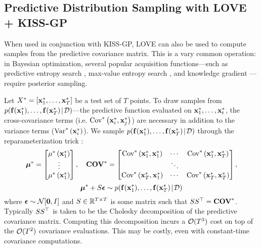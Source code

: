 \subsection{Predictive Distribution Sampling with LOVE{} + KISS-GP}
\label{sec:sampling_method}

When used in conjunction with KISS-GP, LOVE{} can also be used to compute samples from the predictive covariance matrix.
This is a vary common operation: in Bayesian optimization, several popular acquisition functions---such as predictive entropy search \cite{hernandez2014predictive}, max-value entropy search \cite{wang2017max}, and knowledge gradient \cite{frazier2009knowledge}---require posterior sampling.

Let $X^* = [ \mathbf{x}^*_1, \ldots, \mathbf{x}^*_T ]$ be a test set of $T$ points.
To draw samples from $p( \mathbf{f}(\mathbf{x}^*_1), \ldots, \mathbf{f}(\mathbf{x}^*_T) \! \mid \! \mathcal D)$---the predictive function evaluated on $\mathbf{x}^*_1, \ldots, \mathbf{x}^*_t$,
the cross-covariance terms (i.e. $\text{Cov}^* \left( \mathbf{x}^*_i, \mathbf{x}^*_j \right)$) are necessary in addition to the variance terms ($\text{Var}^* \left( \mathbf{x}^*_i \right)$).
We sample $p( \mathbf{f}(\mathbf{x}^*_1), \ldots, \mathbf{f}(\mathbf{x}^*_T) \! \mid \! \mathcal D)$ through the reparameterization trick \cite{kingma2014auto,rezende2014stochastic}:
%
\[
  \boldsymbol{\mu}^* = \begin{bmatrix} \mu^* \left( \mathbf{x}^*_1 \right) \\ \vdots \\ \mu^* \left( \mathbf{x}^*_1 \right) \end{bmatrix},
  \quad
  \textbf{COV}^* = \begin{bmatrix}
    \text{Cov}^* \left( \mathbf{x}^*_1, \mathbf{x}^*_1 \right) & \cdots & \text{Cov}^* \left( \mathbf{x}^*_1, \mathbf{x}^*_T \right) \\
    & \ddots & \\
    \text{Cov}^* \left( \mathbf{x}^*_T, \mathbf{x}^*_1 \right) & \cdots & \text{Cov}^* \left( \mathbf{x}^*_T, \mathbf{x}^*_T \right) \\
  \end{bmatrix},
\]
\begin{equation}
  \boldsymbol{\mu}^* + S \boldsymbol{\epsilon} \sim p( \mathbf{f}(\mathbf{x}^*_1), \ldots, \mathbf{f}(\mathbf{x}^*_T) \! \mid \! \mathcal D)
  \label{eqn:sample}
\end{equation}
%
where $\bepsilon \sim \normaldist{\bzero}{\bI}$ and $S \in \mathbb{R}^{T \times T}$ is some matrix such that $S S^\top = \textbf{COV}^*$.
Typically $S S^\top$ is taken to be the Cholesky decomposition of the predictive covariance matrix.
Computing this decomposition incurs a $\bigo{T^3}$ cost on top of the $\bigo{T^2}$ covariance evaluations.
This may be costly, even with constant-time covariance computations.

